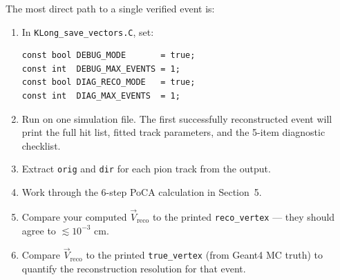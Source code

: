 The most direct path to a single verified event is:

\begin{enumerate}
    \item In \texttt{KLong\_save\_vectors.C}, set:
    \begin{verbatim}
const bool DEBUG_MODE       = true;
const int  DEBUG_MAX_EVENTS = 1;
const bool DIAG_RECO_MODE   = true;
const int  DIAG_MAX_EVENTS  = 1;
    \end{verbatim}

    \item Run on one simulation file. The first successfully reconstructed
    event will print the full hit list, fitted track parameters, and the
    5-item diagnostic checklist.

    \item Extract \texttt{orig} and \texttt{dir} for each pion track from
    the output.

    \item Work through the 6-step PoCA calculation in Section~5.

    \item Compare your computed $\vec{V}_\text{reco}$ to the printed
    \texttt{reco\_vertex} --- they should agree to $\lesssim 10^{-3}$ cm.

    \item Compare $\vec{V}_\text{reco}$ to the printed \texttt{true\_vertex}
    (from Geant4 MC truth) to quantify the reconstruction resolution for
    that event.
\end{enumerate}
